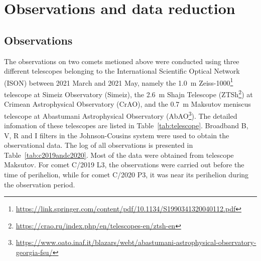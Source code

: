 \section{Observations and data reduction} \label{sec:obs_data}

\subsection{Observations}

The observations on two comets metioned above were conducted using three different telescopes belonging to the International Scientific Optical Network (ISON) between 2021 March and 2021 May, namely the {\qty{1.0}{\m}} Zeiss-1000\footnote{\url{https://link.springer.com/content/pdf/10.1134/S1990341320040112.pdf}} 
telescope at Simeiz Observatory (Simeiz), the {\qty{2.6}{\m}} Shajn Telescope (ZTSh\footnote{\url{https://crao.ru/index.php/en/telescopes-en/ztsh-en}}) 
at Crimean Astrophysical Observatory (CrAO), and the {\qty{0.7}{\m}} Maksutov meniscus telescope at Abastumani Astrophysical Observatory (AbAO\footnote{\url{https://www.oato.inaf.it/blazars/webt/abastumani-astrophysical-observatory-georgia-fsu/}}). 
The detailed infomation of these telescopes are listed in Table~\ref{tab:telescope}. Broadband B, V, R and I filters in the Johnson-Cousins system were used to obtain the observational data. The log of all observations is presented in Table~\ref{tab:c2019andc2020}. Most of the data were obtained from telescope Maksutov. For comet C/2019 L3, the observations were carried out before the time of perihelion, while for comet C/2020 P3, it was near its perihelion during the observation period. 

